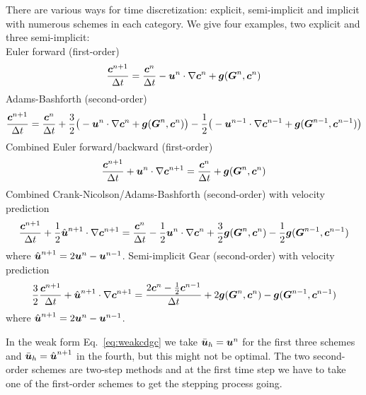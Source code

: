 There are various ways for time discretization: explicit, semi-implicit and
implicit with numerous schemes in each category. We give four examples, two
explicit and three semi-implicit:\\
Euler forward (first-order)
\begin{equation}
 \frac{\boldsymbol{c}^{n+1}}{\Delta t} = \frac{\boldsymbol{c}^{n}}{\Delta t}
-\boldsymbol{u}^n\cdot\nabla\boldsymbol{c}^n+\boldsymbol{g}(\boldsymbol{G}^n,\boldsymbol{c}^n)
\end{equation}
Adams-Bashforth (second-order)
\begin{equation}
 \frac{\boldsymbol{c}^{n+1}}{\Delta t} = \frac{\boldsymbol{c}^{n}}{\Delta t}
+\frac32\big(-\boldsymbol{u}^n\cdot\nabla\boldsymbol{c}^n+\boldsymbol{g}(\boldsymbol{G}^n,\boldsymbol{c}^n)\big)
-\frac12\big( -\boldsymbol{u}^{n-1}\cdot\nabla\boldsymbol{c}^{n-1}+\boldsymbol{g}(\boldsymbol{G}^{n-1},\boldsymbol{c}^{n-1})\big)
\end{equation}
Combined Euler forward/backward (first-order)
\begin{equation}
 \frac{\boldsymbol{c}^{n+1}}{\Delta t}+\boldsymbol{u}^n\cdot\nabla\boldsymbol{c}^{n+1}=
    \frac{\boldsymbol{c}^{n}}{\Delta t} +\boldsymbol{g}(\boldsymbol{G}^n,\boldsymbol{c}^n)
\end{equation}
Combined Crank-Nicolson/Adams-Bashforth (second-order) with velocity prediction
\begin{equation}
 \frac{\boldsymbol{c}^{n+1}}{\Delta t}+\frac12\hat{\boldsymbol{u}}^{n+1}\cdot\nabla\boldsymbol{c}^{n+1}=
 \frac{\boldsymbol{c}^{n}}{\Delta t}
-\frac12\boldsymbol{u}^n\cdot\nabla\boldsymbol{c}^n
+\frac32\boldsymbol{g}(\boldsymbol{G}^n,\boldsymbol{c}^n) -\frac12\boldsymbol{g}(\boldsymbol{G}^{n-1},\boldsymbol{c}^{n-1})
\label{eq:explicitCrankAB2}
\end{equation}
where $\hat{\boldsymbol{u}}^{n+1}=2\boldsymbol{u}^n-\boldsymbol{u}^{n-1}$.
Semi-implicit Gear (second-order) \cite{Karniadakis91,Hulsen96}
with velocity prediction
\begin{equation}
\frac32 \frac{\boldsymbol{c}^{n+1}}{\Delta t}+\hat{\boldsymbol{u}}^{n+1}\cdot\nabla\boldsymbol{c}^{n+1}=
 \frac{2\boldsymbol{c}^{n}-\frac12\boldsymbol{c}^{n-1}}{\Delta t} +
2\boldsymbol{g}(\boldsymbol{G}^n,\boldsymbol{c}^n) -\boldsymbol{g}(\boldsymbol{G}^{n-1},\boldsymbol{c}^{n-1})
\end{equation}
where $\hat{\boldsymbol{u}}^{n+1}=2\boldsymbol{u}^n-\boldsymbol{u}^{n-1}$.

 In the weak form
Eq.~\eqref{eq:weakcdgc} we take $\bar{\boldsymbol{u}}_h=\boldsymbol{u}^n$ for the first three
schemes and $\bar{\boldsymbol{u}}_h=\hat{\boldsymbol{u}}^{n+1}$ in the fourth, but this might
not be optimal. The two second-order schemes are two-step methods and at
the first time step we have to take one of the first-order schemes to get
the stepping process going.

